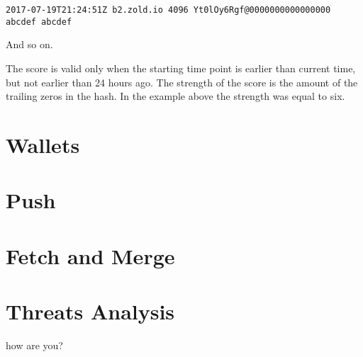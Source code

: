 \documentclass[11pt,oneside]{article}
\begin{document}
\begin{verbatim}
2017-07-19T21:24:51Z b2.zold.io 4096 Yt0lOy6Rgf@0000000000000000 abcdef abcdef
\end{verbatim}

And so on.

The score is valid only when the starting time point is earlier than
current time, but not earlier than 24 hours ago. The strength of the score
is the amount of the trailing zeros in the hash. In the example above the
strength was equal to six.

\section{Wallets}

\section{Push}

\section{Fetch and Merge}

\section{Threats Analysis}

how are you?
\end{document}
